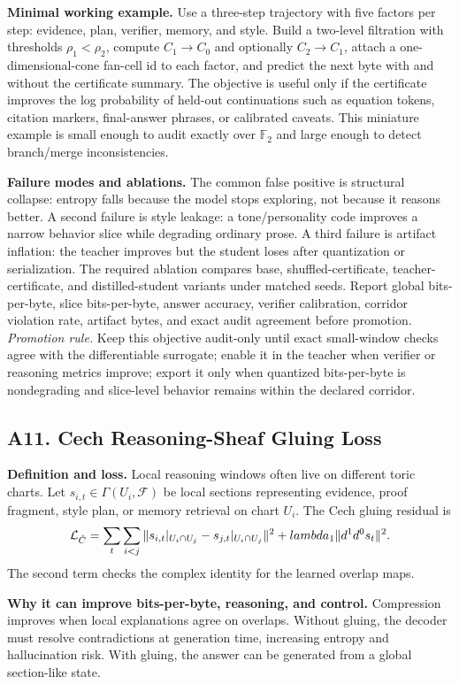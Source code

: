 \documentclass[10pt]{article}
\newcommand{\FF}{\mathbb{F}}
\newcommand{\calF}{\mathcal{F}}
\newcommand{\loss}{\mathcal{L}}
\numberwithin{equation}{section}
\begin{document}
\noindent\textbf{Minimal working example.} Use a three-step trajectory with five factors per step: evidence, plan, verifier, memory, and style. Build a two-level filtration with thresholds $\rho_1<\rho_2$, compute $C_1\to C_0$ and optionally $C_2\to C_1$, attach a one-dimensional-cone fan-cell id to each factor, and predict the next byte with and without the certificate summary. The objective is useful only if the certificate improves the log probability of held-out continuations such as equation tokens, citation markers, final-answer phrases, or calibrated caveats. This miniature example is small enough to audit exactly over $\FF_2$ and large enough to detect branch/merge inconsistencies.

\noindent\textbf{Failure modes and ablations.} The common false positive is structural collapse: entropy falls because the model stops exploring, not because it reasons better. A second failure is style leakage: a tone/personality code improves a narrow behavior slice while degrading ordinary prose. A third failure is artifact inflation: the teacher improves but the student loses after quantization or serialization. The required ablation compares base, shuffled-certificate, teacher-certificate, and distilled-student variants under matched seeds. Report global bits-per-byte, slice bits-per-byte, answer accuracy, verifier calibration, corridor violation rate, artifact bytes, and exact audit agreement before promotion.
\vfill
\noindent\emph{Promotion rule.} Keep this objective audit-only until exact small-window checks agree with the differentiable surrogate; enable it in the teacher when verifier or reasoning metrics improve; export it only when quantized bits-per-byte is nondegrading and slice-level behavior remains within the declared corridor.
\clearpage
\subsection{A11. Cech Reasoning-Sheaf Gluing Loss}
\noindent\textbf{Definition and loss.} Local reasoning windows often live on different toric charts. Let $s_{i,t}\in\Gamma(U_i,\calF)$ be local sections representing evidence, proof fragment, style plan, or memory retrieval on chart $U_i$. The Cech gluing residual is
\[
\loss_{\check C}=\sum_t\sum_{i<j}\|s_{i,t}|_{U_i\cap U_j}-s_{j,t}|_{U_i\cap U_j}\|^2+\\lambda_1\|d^1 d^0 s_t\|^2.
\]
The second term checks the complex identity for the learned overlap maps.

\noindent\textbf{Why it can improve bits-per-byte, reasoning, and control.} Compression improves when local explanations agree on overlaps. Without gluing, the decoder must resolve contradictions at generation time, increasing entropy and hallucination risk. With gluing, the answer can be generated from a global section-like state.
\end{document}
